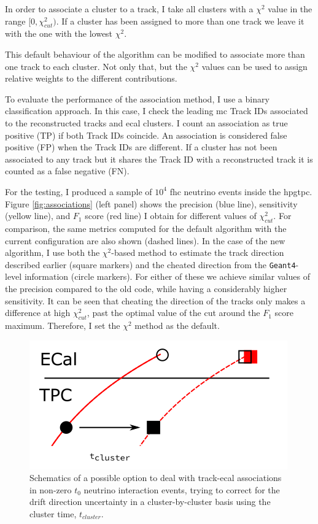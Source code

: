 In order to associate a cluster to a track, I take all clusters with a $\chi^{2}$ value in the range $[0, \chi^{2}_{cut})$. If a cluster has been assigned to more than one track we leave it with the one with the lowest $\chi^{2}$.

This default behaviour of the algorithm can be modified to associate more than one track to each cluster. Not only that, but the $\chi^{2}$ values can be used to assign relative weights to the different contributions.

To evaluate the performance of the association method, I use a binary classification approach. In this case, I check the leading \gls{mc} Track IDs associated to the reconstructed tracks and \gls{ecal} clusters. I count an association as true positive (TP) if both Track IDs coincide. An association is considered false positive (FP) when the Track IDs are different. If a cluster has not been associated to any track but it shares the Track ID with a reconstructed track it is counted as a false negative (FN).

For the testing, I produced a sample of $10^{4}$ \gls{fhc} neutrino events inside the \gls{hpgtpc}. Figure \ref{fig:associations} (left panel) shows the precision (blue line), sensitivity (yellow line), and $F_{1}$ score (red line) I obtain for different values of $\chi^{2}_{cut}$. For comparison, the same metrics computed for the default algorithm with the current configuration are also shown (dashed lines). In the case of the new algorithm, I use both the $\chi^{2}$-based method to estimate the track direction described earlier (square markers) and the cheated direction from the \texttt{Geant4}-level information (circle markers). For either of these we achieve similar values of the precision compared to the old code, while having a considerably higher sensitivity. It can be seen that cheating the direction of the tracks only makes a difference at high $\chi^{2}_{cut}$, past the optimal value of the cut around the $F_{1}$ score maximum. Therefore, I set the $\chi^{2}$ method as the default.

\begin{figure}[t]
	\centering
	\includegraphics[width=.55\linewidth]{Images/GArSoft_PID/associations/drift_correction.png}
	\caption[Schematics of a method to deal with track-\gls{ecal} associations in non-zero $t_{0}$ neutrino interaction events using the cluster time.]{Schematics of a possible option to deal with track-\gls{ecal} associations in non-zero $t_{0}$ neutrino interaction events, trying to correct for the drift direction uncertainty in a cluster-by-cluster basis using the cluster time, $t_{cluster}$.}
	\label{fig:associations_drift}
\end{figure}

